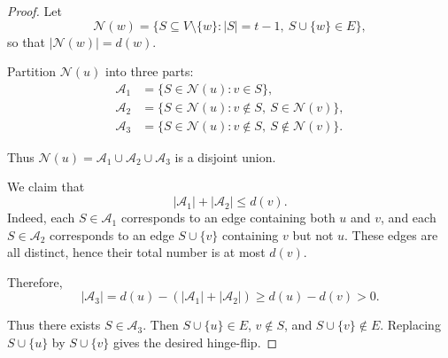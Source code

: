 \documentclass[10pt,a4paper]{amsart}
\begin{document}
\begin{proof}
Let
\[
\mathcal{N}(w) = \{ S \subseteq V \setminus \{w\} : |S| = t-1,\ S \cup \{w\} \in E \},
\]
so that $|\mathcal{N}(w)| = d(w)$.

Partition $\mathcal{N}(u)$ into three parts:
\begin{align*}
\mathcal{A}_1 &= \{ S \in \mathcal{N}(u) : v \in S \}, \\
\mathcal{A}_2 &= \{ S \in \mathcal{N}(u) : v \notin S,\ S \in \mathcal{N}(v) \}, \\
\mathcal{A}_3 &= \{ S \in \mathcal{N}(u) : v \notin S,\ S \notin \mathcal{N}(v) \}.
\end{align*}

Thus $\mathcal{N}(u) = \mathcal{A}_1 \cup \mathcal{A}_2 \cup \mathcal{A}_3$ is a disjoint union.

We claim that
\[
|\mathcal{A}_1| + |\mathcal{A}_2| \le d(v).
\]
Indeed, each $S \in \mathcal{A}_1$ corresponds to an edge containing both $u$ and $v$, and each $S \in \mathcal{A}_2$ corresponds to an edge $S \cup \{v\}$ containing $v$ but not $u$. These edges are all distinct, hence their total number is at most $d(v)$.

Therefore,
\[
|\mathcal{A}_3| = d(u) - (|\mathcal{A}_1| + |\mathcal{A}_2|) \ge d(u) - d(v) > 0.
\]

Thus there exists $S \in \mathcal{A}_3$. Then $S \cup \{u\} \in E$, $v \notin S$, and $S \cup \{v\} \notin E$. Replacing $S \cup \{u\}$ by $S \cup \{v\}$ gives the desired hinge-flip.
\end{proof}
\end{document}

